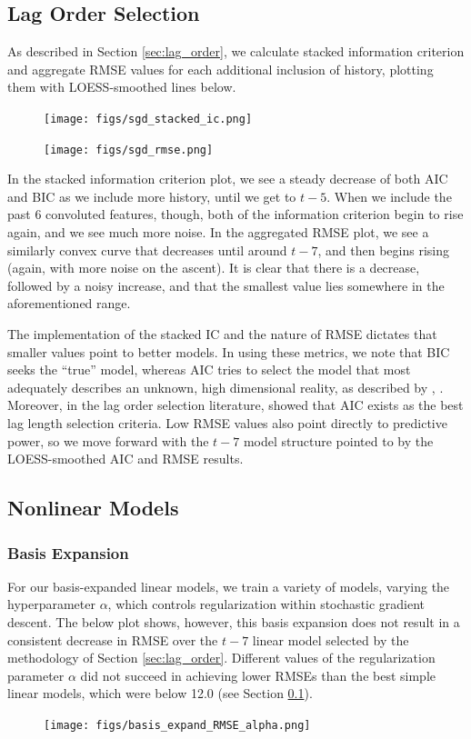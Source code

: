 \documentclass[11pt]{article}
\begin{document}
\subsection{Lag Order Selection}\label{sec:lag-order-results}
As described in Section \ref{sec:lag_order}, we calculate stacked information criterion and aggregate RMSE values for each additional inclusion of history, plotting them with LOESS-smoothed lines below.
\begin{figure}[H]
\centering
\texttt{[image: figs/sgd\_stacked\_ic.png]}
\label{fig:stacked_ic}
\end{figure}
\begin{figure}[H]
\centering
\texttt{[image: figs/sgd\_rmse.png]}
\label{fig:rmse}
\end{figure}
In the stacked information criterion plot, we see a steady decrease of both AIC and BIC as we include more history, until we get to $t-5$.  When we include the past 6 convoluted features, though, both of the information criterion begin to rise again, and we see much more noise.  In the aggregated RMSE plot, we see a similarly convex curve that decreases until around $t-7$, and then begins rising (again, with more noise on the ascent).  It is clear that there is a decrease, followed by a noisy increase, and that the smallest value lies somewhere in the aforementioned range.\par
The implementation of the stacked IC and the nature of RMSE dictates that smaller values point to better models.  In using these metrics, we note that BIC seeks the ``true'' model, whereas AIC tries to select the model that most adequately describes an unknown, high dimensional reality, as described by \cite{aic_bic1}, \cite{aic_bic2}.  Moreover, in the lag order selection literature, \cite{liew} showed that AIC exists as the best lag length selection criteria.  Low RMSE values also point directly to predictive power, so we move forward with the $t-7$ model structure pointed to by the LOESS-smoothed AIC and RMSE results.
\subsection{Nonlinear Models}
\subsubsection{Basis Expansion}
For our basis-expanded linear models, we train a variety of models, varying the hyperparameter $\alpha$, which controls regularization within stochastic gradient descent.  The below plot shows, however, this basis expansion does not result in a consistent decrease in RMSE over the $t-7$ linear model selected by the methodology of Section \ref{sec:lag_order}.  Different values of the regularization parameter $\alpha$ did not succeed in achieving lower RMSEs than the best simple linear models, which were below 12.0 (see Section \ref{sec:lag-order-results}).
\begin{figure}[H]
\centering
\texttt{[image: figs/basis\_expand\_RMSE\_alpha.png]}
\end{figure}
\end{document}
